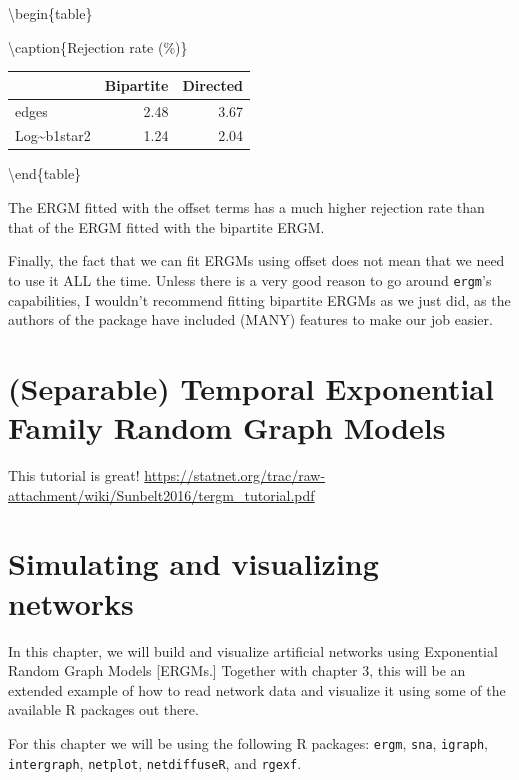 \documentclass[]{book}
\begin{document}
\textbackslash{}begin\{table\}

\textbackslash{}caption\{\label{tab:05-example2-post-dist}Rejection rate (\%)\}
\centering

\begin{tabular}[t]{l|r|r}
\hline
  & Bipartite & Directed\\
\hline
edges & 2.48 & 3.67\\
\hline
Log\textasciitilde{}b1star2 & 1.24 & 2.04\\
\hline
\end{tabular}

\textbackslash{}end\{table\}

The ERGM fitted with the offset terms has a much higher rejection rate
than that of the ERGM fitted with the bipartite ERGM.

Finally, the fact that we can fit ERGMs using offset does not mean that
we need to use it ALL the time. Unless there is a very good reason to
go around \texttt{ergm}'s capabilities, I wouldn't recommend fitting bipartite
ERGMs as we just did, as the authors of the package have included (MANY)
features to make our job easier.

\hypertarget{separable-temporal-exponential-family-random-graph-models}{%
\chapter{(Separable) Temporal Exponential Family Random Graph Models}\label{separable-temporal-exponential-family-random-graph-models}}

This tutorial is great! \url{https://statnet.org/trac/raw-attachment/wiki/Sunbelt2016/tergm_tutorial.pdf}

\hypertarget{simulating-and-visualizing-networks}{%
\chapter{Simulating and visualizing networks}\label{simulating-and-visualizing-networks}}

In this chapter, we will build and visualize artificial networks using Exponential
Random Graph Models {[}ERGMs.{]} Together with chapter 3, this will be an extended
example of how to read network data and visualize it using some of the available
R packages out there.

For this chapter we will be using the following R packages: \texttt{ergm}, \texttt{sna}, \texttt{igraph},
\texttt{intergraph}, \texttt{netplot}, \texttt{netdiffuseR}, and \texttt{rgexf}.
\end{document}
